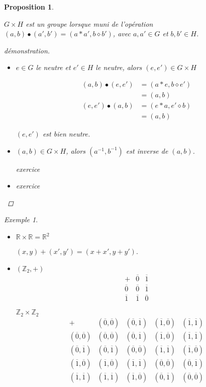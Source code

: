 \documentclass{report}
\newcommand*{\reels}{\mathbb{R}}
\newcommand*{\entiers}{\mathbb{Z}}
\newtheorem*{prop}{Proposition}
\theoremstyle{definition}
\theoremstyle{remark}
\newtheorem*{exem}{Exemple}
\begin{document}
	\begin{prop}
		~

		$G \times H$ est un groupe lorsque muni de l'op\'eration $(a,b) \bullet (a',b') = (a*a',b \diamond b')$, avec $a,a' \in G$ et $b,b' \in H$.
		\begin{proof}[d\'emonstration]~

			\begin{itemize}
				\item[$(N)$] $e \in G$ le neutre et $e' \in H$ le neutre, alors $(e,e') \in G \times H$

				\begin{align*}
					(a,b) \bullet (e,e')&= (a*e, b \diamond e')\\
					&= (a,b)\\
					(e,e') \bullet (a,b)&= (e*a, e' \diamond b)\\
					&= (a,b)
				\end{align*}

				$(e,e')$ est bien neutre.
				\item[$(I)$] $(a,b) \in G \times H$, alors $(a^{-1},b^{-1})$ est inverse de $(a,b)$.

				exercice
				\item[$(A)$] exercice
			\end{itemize}
		\end{proof}
	\end{prop}
	\begin{exem}
		\begin{itemize}
			\item $\reels \times \reels = \reels^2$

			$(x,y)+(x',y')=(x+x',y+y')$.
			\item $(\entiers_2,+)$
			\renewcommand{\arraystretch}{1.5}
			\[
			\begin{array}{c||c|c}
				+&\overline0&\overline1\\
				\hline\hline
				\overline0&\overline0&\overline1\\
				\hline
				\overline1&\overline1&\overline0
			\end{array}
			\]

			$\entiers_2 \times \entiers_2$
			\[
			\begin{array}{c||c|c|c|c}
				+&(\overline0,\overline0)& (\overline0,\overline1)& (\overline1,\overline0)& (\overline1,\overline1)\\
				\hline\hline
				(\overline0,\overline0)& (\overline0,\overline0)& (\overline0,\overline1)& (\overline1,\overline0)& (\overline1,\overline1)\\
				\hline
				(\overline0,\overline1)& (\overline0,\overline1)& (\overline0,\overline0)& (\overline1,\overline1)& (\overline1,\overline0)\\
				\hline
				(\overline1,\overline0)& (\overline1,\overline0)& (\overline1,\overline1)& (\overline0,\overline0)& (\overline0,\overline1)\\
				\hline
				(\overline1,\overline1)& (\overline1,\overline1)& (\overline1,\overline0)& (\overline0,\overline1)& (\overline0,\overline0)
			\end{array}
			\]
			\renewcommand{\arraystretch}{1}
		\end{itemize}
	\end{exem}
\end{document}
